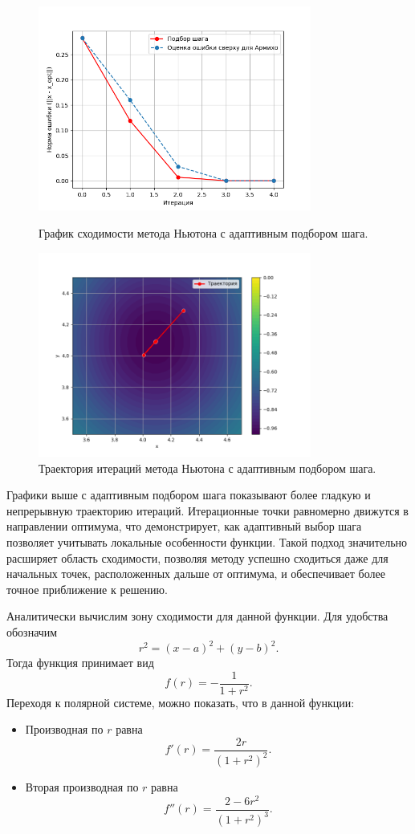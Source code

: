 \documentclass[a4paper,12pt]{article}
\begin{document}
\begin{figure}[H]
    \centering
    \includegraphics[width=0.8\textwidth]{images/newton_adaptive_conv.png}
    \caption{График сходимости метода Ньютона с адаптивным подбором шага.}
    \includegraphics[width=0.8\textwidth]{images/newton_adaptive_traj.png}
    \caption{Траектория итераций метода Ньютона с адаптивным подбором шага.}
\end{figure}
\noindent Графики выше с адаптивным подбором шага показывают более гладкую и непрерывную траекторию итераций. Итерационные точки равномерно движутся в направлении оптимума, что демонстрирует, как адаптивный выбор шага позволяет учитывать локальные особенности функции. Такой подход значительно расширяет область сходимости, позволяя методу успешно сходиться даже для начальных точек, расположенных дальше от оптимума, и обеспечивает более точное приближение к решению.

Аналитически вычислим зону сходимости для данной функции. Для удобства обозначим 
\[
r^2 = (x-a)^2+(y-b)^2.
\]
Тогда функция принимает вид
\[
f(r)=-\frac{1}{1+r^2}.
\]
Переходя к полярной системе, можно показать, что в данной функции:
\begin{itemize}
    \item Производная по \(r\) равна 
    \[
    f'(r) = \frac{2r}{(1+r^2)^2}.
    \]
    \item Вторая производная по \(r\) равна
    \[
    f''(r) = \frac{2-6r^2}{(1+r^2)^3}.
    \]
\end{itemize}
\end{document}
